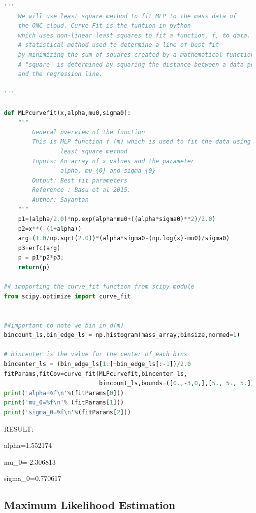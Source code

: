 \documentclass{article}
\begin{document}
\begin{lstlisting}[language=Python, caption=Python example]
''' 
    We will use least square method to fit MLP to the mass data of 
    the ONC cloud. Curve Fit is the funtion in python
    which uses non-linear least squares to fit a function, f, to data.
    A statistical method used to determine a line of best fit
    by minimizing the sum of squares created by a mathematical function.
    A "square" is determined by squaring the distance between a data point 
    and the regression line.

'''

def MLPcurvefit(x,alpha,mu0,sigma0):
    """
        General overview of the function
        This is MLP function f (m) which is used to fit the data using 
                least square method 
        Inputs: An array of x values and the parameter 
                alpha, mu_{0} and sigma_{0}
        Output: Best fit parameters
        Reference : Basu et al 2015. 
        Author: Sayantan
    """
    p1=(alpha/2.0)*np.exp(alpha*mu0+((alpha*sigma0)**2)/2.0)
    p2=x**(-(1+alpha))
    arg=(1.0/np.sqrt(2.0))*(alpha*sigma0-(np.log(x)-mu0)/sigma0)
    p3=erfc(arg)
    p = p1*p2*p3;
    return(p)

## imoporting the curve_fit function from scipy module
from scipy.optimize import curve_fit


##important to note we bin in d(m)
bincount_ls,bin_edge_ls = np.histogram(mass_array,binsize,normed=1) 

# bincenter is the value for the center of each bins
bincenter_ls = (bin_edge_ls[1:]+bin_edge_ls[:-1])/2.0
fitParams,fitCov=curve_fit(MLPcurvefit,bincenter_ls,
                           bincount_ls,bounds=([0.,-3,0,],[5., 5., 5.]))
print('alpha=%f\n'%(fitParams[0]))
print('mu_0=%f\n'% (fitParams[1]))
print('sigma_0=%f\n'%(fitParams[2]))
\end{lstlisting}

RESULT: 

alpha=1.552174

mu_0=-2.306813

sigma_0=0.770617


\subsection{Maximum Likelihood Estimation}
\end{document}
